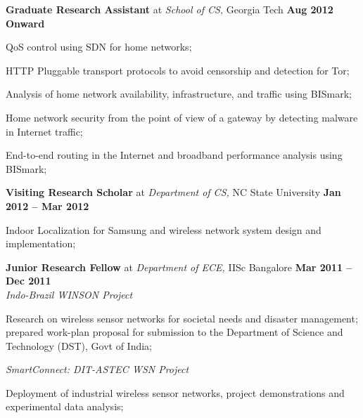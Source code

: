 \documentclass[margin,line]{resume}
\begin{document}
\begin{resume}
    \textbf{Graduate Research Assistant} at \emph{School of CS,} Georgia Tech		\hfill \textbf{Aug 2012 Onward} \\\vspace{-4mm}
    \begin{list2}
    \item QoS control using SDN for home networks;
    \item HTTP Pluggable transport protocols to avoid censorship and detection for Tor;
    \item Analysis of home network availability, infrastructure, and traffic using BISmark;
    \item Home network security from the point of view of a gateway by detecting malware in Internet traffic;
    \item End-to-end routing in the Internet and broadband performance analysis using BISmark;
    \end{list2}
\vspace{-1.5mm}

    \textbf{Visiting Research Scholar} at \emph{Department of CS,} NC State University		\hfill \textbf{Jan 2012 -- Mar 2012} \\\vspace{-4mm}
    \begin{list2}
    \item Indoor Localization for Samsung and wireless network system design and implementation;
    \end{list2}
\vspace{-1.5mm}

    \textbf{Junior Research Fellow} at \emph{Department of ECE,} IISc Bangalore				\hfill \textbf{Mar 2011 -- Dec 2011}		\\
    \emph{Indo-Brazil WINSON Project} 				 			\\\vspace{-4mm}
    \begin{list2}
    \item Research on wireless sensor networks for societal needs and disaster management;
    prepared work-plan proposal for submission to the Department of Science and Technology (DST), Govt of India;
    \end{list2}
\vspace{-3mm}

    \emph{SmartConnect: DIT-ASTEC WSN Project}					\\\vspace{-4mm}
    \begin{list2}
    \item Deployment of industrial wireless sensor networks, project demonstrations and experimental data analysis;
    \end{list2}
\vspace{-1.5mm}


\end{resume}
\end{document}

